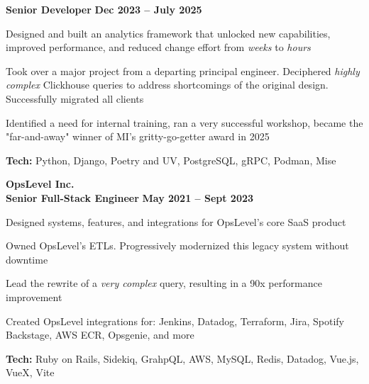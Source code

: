 \documentclass[margin,line]{resume}
\begin{document}
\begin{resume}
    \hspace{2.6mm}\textbf{Senior Developer} \hfill \textbf{Dec 2023 -- July 2025}\vspace{1mm}
    \begin{list2}
        \item Designed and built an analytics framework that unlocked new capabilities, improved performance, and reduced change effort from \textit{weeks} to \textit{hours}
        \vspace{1mm}
        \item Took over a major project from a departing principal engineer. Deciphered \textit{highly complex} Clickhouse queries to address shortcomings of the original design. Successfully migrated all clients
        \vspace{1mm}
        \item Identified a need for internal training, ran a very successful workshop, became the "far-and-away" winner of MI's gritty-go-getter award in 2025
        \vspace{1mm}
        \item\textbf{Tech:} Python, Django, Poetry and UV, PostgreSQL, gRPC, Podman, Mise
    \end{list2}



    \hspace{-3mm}\textbf{\listing OpsLevel Inc.} \vspace{3mm}\\\vspace{1mm}
    \hspace{1.2mm}\textbf{Senior Full-Stack Engineer} \hfill \textbf{May 2021 -- Sept 2023}\vspace{1mm}
    \begin{list2}
        \item Designed systems, features, and integrations for OpsLevel's core SaaS product
        \vspace{1mm}
        \item Owned OpsLevel's ETLs. Progressively modernized this legacy system without downtime
        \vspace{1mm}
        \item Lead the rewrite of a \textit{very complex} query, resulting in a 90x performance improvement
        \vspace{1mm}
        \item Created OpsLevel integrations for: Jenkins, Datadog, Terraform, Jira, Spotify Backstage, AWS ECR, Opsgenie, and more
        \vspace{1mm}
        \item\textbf{Tech:} Ruby on Rails, Sidekiq, GrahpQL, AWS, MySQL, Redis, Datadog, Vue.js, VueX, Vite
    \end{list2}


\end{resume}
\end{document}
